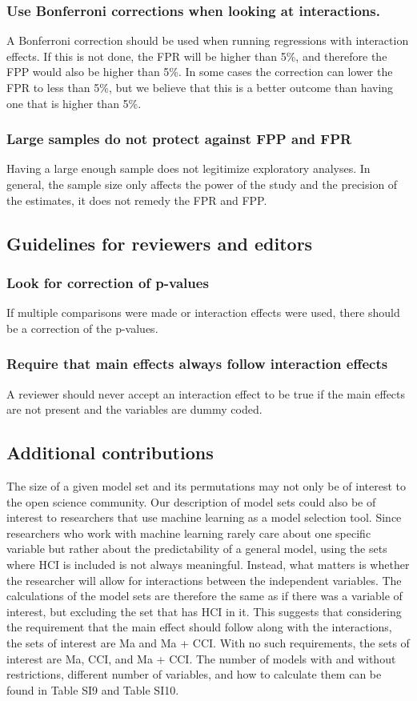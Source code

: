 \subsubsection{Use Bonferroni corrections when looking at interactions.}
A Bonferroni correction should be used when running regressions with interaction effects. If this is not done, the FPR will be higher than 5\%, and therefore the FPP would also be higher than 5\%. In some cases the correction can lower the FPR to less than 5\%, but we believe that this is a better outcome than having one that is higher than 5\%. 
\subsubsection{Large samples do not protect against FPP and FPR}
Having a large enough sample does not legitimize exploratory analyses. In general, the sample size only affects the power of the study and the precision of the estimates, it does not remedy the FPR and FPP. 

\subsection{Guidelines for reviewers and editors}

\subsubsection{Look for correction of p-values}
If multiple comparisons were made or interaction effects were used, there should be a correction of the p-values.
\subsubsection{Require that main effects always follow interaction effects}
A reviewer should never accept an interaction effect to be true if the main effects are not present and the variables are dummy coded. 

\subsection{Additional contributions}
The size of a given model set and its permutations may not only be of interest to the open science community. Our description of model sets could also be of interest to researchers that use machine learning as a model selection tool. Since researchers who work with machine learning rarely care about one specific variable but rather about the predictability of a general model, using the sets where HCI is included is not always meaningful. Instead, what matters is whether the researcher will allow for interactions between the independent variables. The calculations of the model sets are therefore the same as if there was a variable of interest, but excluding the set that has HCI in it. This suggests that considering the requirement that the main effect should follow along with the interactions, the sets of interest are Ma and Ma + CCI. With no such requirements, the sets of interest are Ma, CCI, and Ma + CCI. The number of models with and without restrictions, different number of variables, and how to calculate them can be found in Table SI9 and Table SI10. 


 
